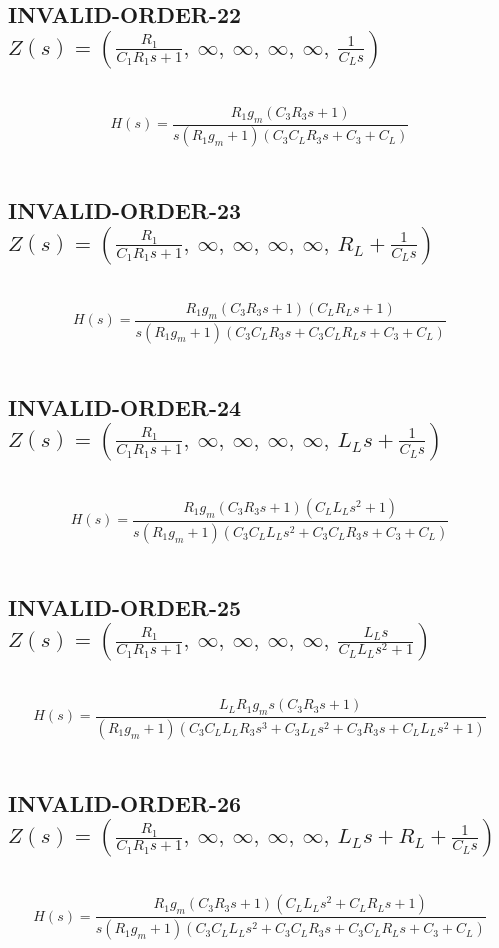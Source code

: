 \documentclass{article}
\begin{document}
\subsection{INVALID-ORDER-22 $Z(s) = \left( \frac{R_{1}}{C_{1} R_{1} s + 1}, \  \infty, \  \infty, \  \infty, \  \infty, \  \frac{1}{C_{L} s}\right)$ } \ 
\textbf{\[H(s) = \frac{R_{1} g_{m} \left(C_{3} R_{3} s + 1\right)}{s \left(R_{1} g_{m} + 1\right) \left(C_{3} C_{L} R_{3} s + C_{3} + C_{L}\right)}\] } \ 
\subsection{INVALID-ORDER-23 $Z(s) = \left( \frac{R_{1}}{C_{1} R_{1} s + 1}, \  \infty, \  \infty, \  \infty, \  \infty, \  R_{L} + \frac{1}{C_{L} s}\right)$ } \ 
\textbf{\[H(s) = \frac{R_{1} g_{m} \left(C_{3} R_{3} s + 1\right) \left(C_{L} R_{L} s + 1\right)}{s \left(R_{1} g_{m} + 1\right) \left(C_{3} C_{L} R_{3} s + C_{3} C_{L} R_{L} s + C_{3} + C_{L}\right)}\] } \ 
\subsection{INVALID-ORDER-24 $Z(s) = \left( \frac{R_{1}}{C_{1} R_{1} s + 1}, \  \infty, \  \infty, \  \infty, \  \infty, \  L_{L} s + \frac{1}{C_{L} s}\right)$ } \ 
\textbf{\[H(s) = \frac{R_{1} g_{m} \left(C_{3} R_{3} s + 1\right) \left(C_{L} L_{L} s^{2} + 1\right)}{s \left(R_{1} g_{m} + 1\right) \left(C_{3} C_{L} L_{L} s^{2} + C_{3} C_{L} R_{3} s + C_{3} + C_{L}\right)}\] } \ 
\subsection{INVALID-ORDER-25 $Z(s) = \left( \frac{R_{1}}{C_{1} R_{1} s + 1}, \  \infty, \  \infty, \  \infty, \  \infty, \  \frac{L_{L} s}{C_{L} L_{L} s^{2} + 1}\right)$ } \ 
\textbf{\[H(s) = \frac{L_{L} R_{1} g_{m} s \left(C_{3} R_{3} s + 1\right)}{\left(R_{1} g_{m} + 1\right) \left(C_{3} C_{L} L_{L} R_{3} s^{3} + C_{3} L_{L} s^{2} + C_{3} R_{3} s + C_{L} L_{L} s^{2} + 1\right)}\] } \ 
\subsection{INVALID-ORDER-26 $Z(s) = \left( \frac{R_{1}}{C_{1} R_{1} s + 1}, \  \infty, \  \infty, \  \infty, \  \infty, \  L_{L} s + R_{L} + \frac{1}{C_{L} s}\right)$ } \ 
\textbf{\[H(s) = \frac{R_{1} g_{m} \left(C_{3} R_{3} s + 1\right) \left(C_{L} L_{L} s^{2} + C_{L} R_{L} s + 1\right)}{s \left(R_{1} g_{m} + 1\right) \left(C_{3} C_{L} L_{L} s^{2} + C_{3} C_{L} R_{3} s + C_{3} C_{L} R_{L} s + C_{3} + C_{L}\right)}\] } \ 
\end{document}
